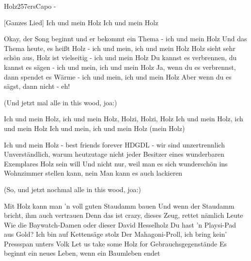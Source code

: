 \begin{song}{Holz}{257ers}{Capo -}

 [Ganzes Lied]
Ich und mein Holz
Ich und mein Holz

Okay, der Song beginnt und er bekommt ein Thema - ich und mein Holz
Und das Thema heute, es heißt Holz - ich und mein, ich und mein Holz
Holz sieht sehr schön aus, Holz ist vielseitig - ich und mein Holz
Du kannst es verbrennen, du kannst es sägen - ich und mein, ich und mein Holz
Ja, wenn du es verbrennst, dann spendet es Wärme - ich und mein, ich und mein Holz
Aber wenn du es sägst, dann nicht - eh!

(Und jetzt mal alle in this wood, joa:)

Ich und mein Holz, ich und mein Holz, Holzi, Holzi, Holz
Ich und mein Holz, ich und mein Holz
Ich und mein, ich und mein Holz (mein Holz)

Ich und mein Holz - best friends forever
HDGDL - wir sind unzertrennlich
Unverständlich, warum heutzutage nicht jeder
Besitzer eines wunderbaren Exemplares Holz sein will
Und nicht nur, weil man es sich wunderschön ins Wohnzimmer stellen 
kann, nein
Man kann es auch lackieren

(So, und jetzt nochmal alle in this wood, joa:)

 

Mit Holz kann man 'n voll guten Staudamm bauen
Und wenn der Staudamm bricht, ihm auch vertrauen
Denn das ist crazy, dieses Zeug, rettet nämlich Leute
Wie die Baywatch-Damen oder dieser David Hesselholz
Du hast 'n Playsi-Pad aus Gold? Ich bin auf Kettensäge stolz
Der Mahagoni-Proll, ich bring kein' Pressspan unters Volk
Let us take some Holz for Gebrauchsgegenstände
Es beginnt ein neues Leben, wenn ein Baumleben endet


\end{song}

